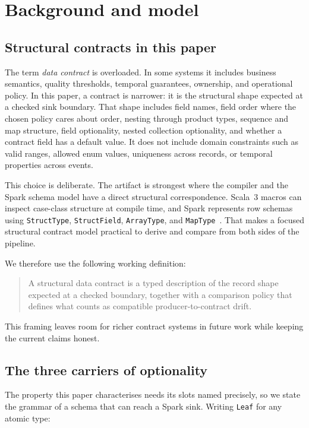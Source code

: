 \section{Background and model}

\subsection{Structural contracts in this paper}

The term \emph{data contract} is overloaded. In some systems it includes business semantics, quality thresholds, temporal guarantees, ownership, and operational policy. In this paper, a contract is narrower: it is the structural shape expected at a checked sink boundary. That shape includes field names, field order where the chosen policy cares about order, nesting through product types, sequence and map structure, field optionality, nested collection optionality, and whether a contract field has a default value. It does not include domain constraints such as valid ranges, allowed enum values, uniqueness across records, or temporal properties across events.

This choice is deliberate. The artifact is strongest where the compiler and the Spark schema model have a direct structural correspondence. Scala~3 macros can inspect case-class structure at compile time, and Spark represents row schemas using \texttt{StructType}, \texttt{StructField}, \texttt{ArrayType}, and \texttt{MapType}~\cite{scala3_reflection,spark_structtype}. That makes a focused structural contract model practical to derive and compare from both sides of the pipeline.

We therefore use the following working definition:

\begin{quote}
A structural data contract is a typed description of the record shape expected at a checked boundary, together with a comparison policy that defines what counts as compatible producer-to-contract drift.
\end{quote}

This framing leaves room for richer contract systems in future work while keeping the current claims honest.

\subsection{The three carriers of optionality}
\label{sec:carriers}

The property this paper characterises needs its slots named precisely, so we state the grammar of a schema that can reach a Spark sink. Writing \texttt{Leaf} for any atomic type:

